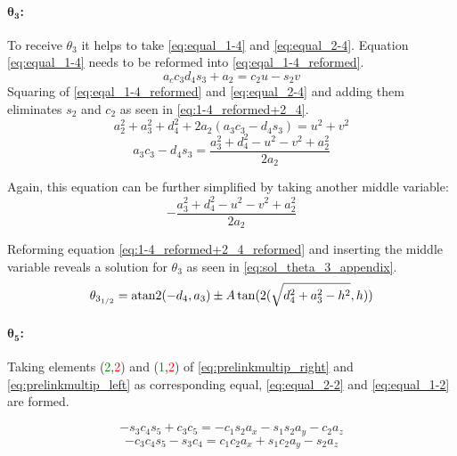 \paragraph{$\pmb{\theta_3}$:}

To receive $\theta_3$ it helps to take  \ref{eq:equal_1-4} and \ref{eq:equal_2-4}. Equation \ref{eq:equal_1-4} needs to be reformed into \ref{eq:eqal_1-4_reformed}.
\begin{equation} \label{eq:eqal_1-4_reformed}
a_c c_3 d_4 s_3 + a_2 = c_2 u -s_2 v
\end{equation}
Squaring of \ref{eq:eqal_1-4_reformed} and \ref{eq:equal_2-4} and adding them eliminates $s_2$ and $c_2$ as seen in \ref{eq:1-4_reformed+2_4}.
\begin{equation}\label{eq:1-4_reformed+2_4}
a_2^2 + a_3^2 +d_4^2 + 2 a_2(a_3 c_3 -d_4 s_3) = u^2 + v^2
\end{equation}
\begin{equation}\label{eq:1-4_reformed+2_4_reformed}
a_3 c_3 - d_4 s_3 = \frac{a_3^2 + d_4^2 - u^2 -v^2 +a_2^2}{2a_2}
\end{equation}

Again, this equation can be further simplified by taking another middle variable:
\begin{equation*}
-\frac{a_3^2 + d_4^2 - u^2 -v^2 + a_2^2}{2a_2}
\end{equation*}

Reforming equation \ref{eq:1-4_reformed+2_4_reformed} and inserting the middle variable reveals a solution for $\theta_3$ as seen in \cref{eq:sol_theta_3_appendix}.
\begin{equation}\label{eq:sol_theta_3_appendix}
\theta_{3_{1/2}} = \operatorname{atan2}(-d_4 , a_3) \pm A \tan (2 (\sqrt{d_4^2 +a_3^2 -h^2} , h))
\end{equation}


\paragraph{$\pmb{\theta_5}$:}
Taking elements (\textcolor{green}{2},\textcolor{red}{2}) and (\textcolor{green}{1},\textcolor{red}{2}) of  \ref{eq:prelinkmultip_right} and \ref{eq:prelinkmultip_left} as corresponding equal,  \ref{eq:equal_2-2} and \ref{eq:equal_1-2} are formed.

\begin{equation}\label{eq:equal_2-2}
-s_3 c_4 s_5 + c_3 c_5 = -c_1 s_2 a_x - s_1 s_2 a_y -c_2 a_z
\end{equation}
\begin{equation}\label{eq:equal_1-2}
-c_3 c_4 s_5 - s_3 c_4 = c_1 c_2 a_x + s_1 c_2 a_y - s_2 a_z
\end{equation}

